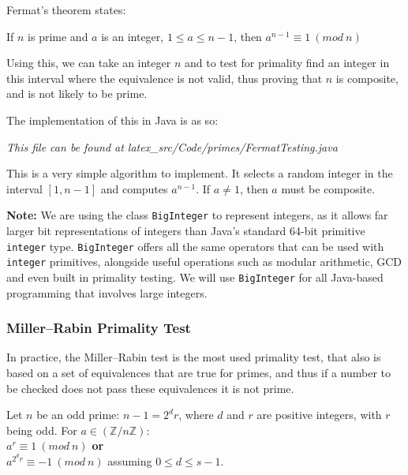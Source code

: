     Fermat's theorem states:
    
    \begin{center}
      If $n$ is prime and $a$ is an integer, $1 \leq a \leq n - 1$, then
      $a^{n-1} \equiv 1 \ (mod \ n)$
    \end{center}
    
    Using this, we can take an integer $n$ and to test for primality find an integer in this interval where the equivalence is not valid, thus proving that $n$ is composite, and is not likely to be prime.
    
    The implementation of this in Java is as so:
    
    \lstset{language=Java}
    
    
    \emph{This file can be found at latex\_src/Code/primes/FermatTesting.java}
    
    This is a very simple algorithm to implement. It selects a random integer in the interval $[1,n-1]$ and computes $a^{n-1}$. If $a \neq 1$, then $a$ must be composite.
    
    \textbf{Note:} We are using the class \verb!BigInteger! to represent integers, as it allows far larger bit representations of integers than Java's standard 64-bit primitive \verb!integer! type. \verb!BigInteger! offers all the same operators that can be used with \verb!integer! primitives, alongside useful operations such as modular arithmetic, GCD and even built in primality testing. We will use \verb!BigInteger! for all Java-based programming that involves large integers.
    
    \subsubsection{Miller--Rabin Primality Test}
    
    In practice, the Miller--Rabin test is the most used primality test, that also is based on a set of equivalences that are true for primes, and thus if a number to be checked does not pass these equivalences it is not prime. \\
    
    \begin{mathdef}
      Let $n$ be an odd prime: $n - 1 = 2^dr$, where $d$ and $r$ are positive integers, with $r$ being odd. For $a \in (\mathbb{Z}/n\mathbb{Z})$: \\
      $a^r \equiv 1 \ (mod \ n)$ \textbf{or} \\
      $a^{2^dr} \equiv -1 \ (mod \ n)$ assuming $0 \leq d \leq s - 1$.
    \end{mathdef}
    
